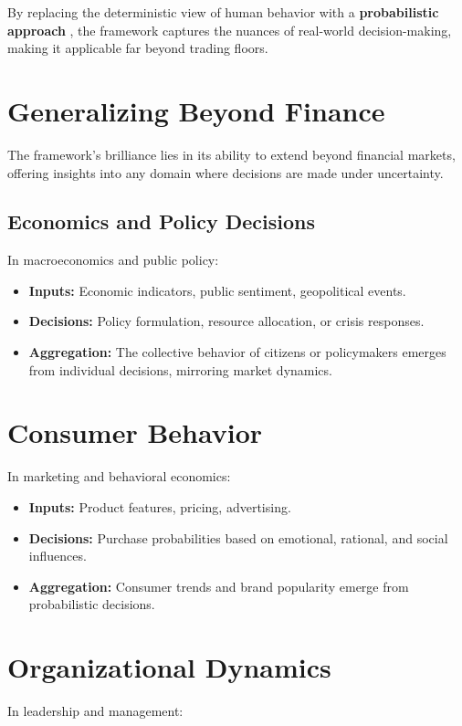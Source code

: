 \documentclass[a4]{article}
\begin{document}
By replacing the deterministic view of human behavior with a {\bf probabilistic approach} , the framework captures the nuances of real-world decision-making, making it applicable far beyond trading floors.

\section{Generalizing Beyond Finance}

The framework's brilliance lies in its ability to extend beyond financial markets, offering insights into any domain where decisions are made under uncertainty. 

\subsection{Economics and Policy Decisions}
In macroeconomics and public policy:

\begin{itemize}
\item   {\bf Inputs:}  Economic indicators, public sentiment, geopolitical events.
\item {\bf Decisions:}  Policy formulation, resource allocation, or crisis responses.
\item {\bf Aggregation:}  The collective behavior of citizens or policymakers emerges from individual decisions, mirroring market dynamics.
\end{itemize}

\section{Consumer Behavior} 
In marketing and behavioral economics:

\begin{itemize}
\item  {\bf Inputs:}  Product features, pricing, advertising.
\item {\bf Decisions:}  Purchase probabilities based on emotional, rational, and social influences.
\item {\bf Aggregation:}  Consumer trends and brand popularity emerge from probabilistic decisions.
\end{itemize}

\section{Organizational Dynamics} 
In leadership and management:
\end{document}
